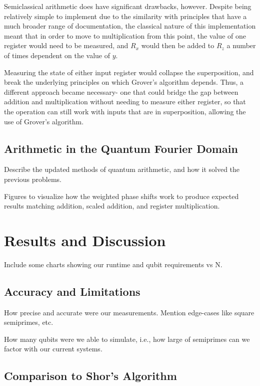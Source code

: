 \documentclass[twocolumn]{cinc}
\begin{document}
  Semiclassical arithmetic does have significant drawbacks, however. Despite
  being relatively simple to implement due to the similarity with principles
  that have a much broader range of documentation, the classical nature of this
  implementation meant that in order to move to multiplication from this point,
  the value of one register would need to be measured, and $R_x$ would then be
  added to $R_z$ a number of times dependent on the value of $y$.

  Measuring the state of either input register would collapse the superposition,
  and break the underlying principles on which Grover's algorithm depends. Thus,
  a different approach became necessary- one that could bridge the gap between 
  addition and multiplication without needing to measure either register,
  so that the operation can still work with inputs that are in superposition,
  allowing the use of Grover's algorithm.

  \subsection{Arithmetic in the Quantum Fourier Domain}  

  Describe the updated methods of quantum arithmetic, and how it solved the 
  previous problems.

  Figures to visualize how the weighted phase shifts work to produce
  expected results matching addition, scaled addition, and register 
  multiplication.

\section{Results and Discussion}

Include some charts showing our runtime and qubit requirements vs N.

  \subsection{Accuracy and Limitations}

  How precise and accurate were our measurements. Mention edge-cases like
  square semiprimes, etc.

  How many qubits were we able to simulate, i.e., how large of semiprimes
  can we factor with our current systems.

  \subsection{Comparison to Shor's Algorithm}
\end{document}
